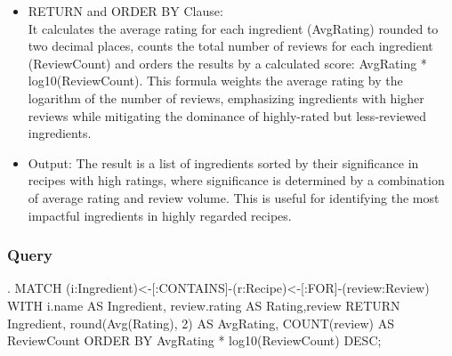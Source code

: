 \begin{enumerate}
\begin{itemize}
    \item RETURN and ORDER BY Clause:\\
It calculates the average rating for each ingredient (AvgRating) rounded to two decimal places, counts the total number of reviews for each ingredient (ReviewCount) and orders the results by a calculated score: AvgRating * log10(ReviewCount). This formula weights the average rating by the logarithm of the number of reviews, emphasizing ingredients with higher reviews while mitigating the dominance of highly-rated but less-reviewed ingredients.
    \item Output:
The result is a list of ingredients sorted by their significance in recipes with high ratings, where significance is determined by a combination of average rating and review volume. This is useful for identifying the most impactful ingredients in highly regarded recipes.
 \end{itemize}

    \subsubsection{Query}
\begin{CypherQuery}
.
MATCH (i:Ingredient)<-[:CONTAINS]-(r:Recipe)<-[:FOR]-(review:Review)
WITH i.name AS Ingredient,
review.rating AS Rating,review
RETURN Ingredient, round(Avg(Rating), 2) AS AvgRating,
COUNT(review) AS ReviewCount
ORDER BY AvgRating * log10(ReviewCount) DESC;
\end{CypherQuery}

\end{enumerate}
